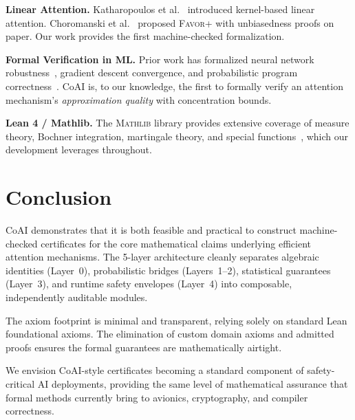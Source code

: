 \documentclass[11pt,a4paper,twocolumn]{article}
\theoremstyle{definition}
\theoremstyle{remark}
\newcommand{\favor}{\textsc{Favor+}}
\newcommand{\mathlib}{\textsc{Mathlib}}
\begin{document}
\textbf{Linear Attention.}\quad
Katharopoulos et al.~\cite{katharopoulos2020transformers} introduced
kernel-based linear attention. Choromanski et
al.~\cite{choromanski2021rethinking} proposed \favor{} with unbiasedness
proofs on paper. Our work provides the first machine-checked formalization.

\textbf{Formal Verification in ML.}\quad
Prior work has formalized neural network robustness~\cite{katz2017reluplex},
gradient descent convergence, and probabilistic program
correctness~\cite{bagnall2023decidability}. CoAI is, to our knowledge, the
first to formally verify an attention mechanism's \emph{approximation
quality} with concentration bounds.

\textbf{Lean 4 / Mathlib.}\quad
The \mathlib{} library provides extensive coverage of measure theory,
Bochner integration, martingale theory, and special
functions~\cite{mathlib2020}, which our development leverages throughout.


\section{Conclusion}
\label{sec:conclusion}

CoAI demonstrates that it is both feasible and practical to construct
machine-checked certificates for the core mathematical claims underlying
efficient attention mechanisms. The 5-layer architecture cleanly separates
algebraic identities (Layer~0), probabilistic bridges (Layers~1--2),
statistical guarantees (Layer~3), and runtime safety envelopes (Layer~4)
into composable, independently auditable modules.

The axiom footprint is minimal and transparent, relying solely on standard Lean foundational axioms. The elimination of custom domain axioms and admitted proofs ensures the formal guarantees are mathematically airtight.

We envision CoAI-style certificates becoming a standard component of
safety-critical AI deployments, providing the same level of mathematical
assurance that formal methods currently bring to avionics, cryptography,
and compiler correctness.
\end{document}
